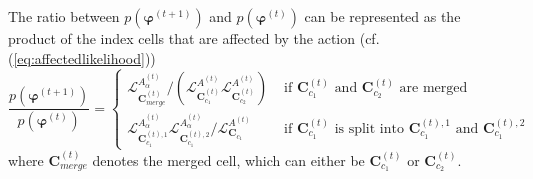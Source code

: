 The ratio between $p(\boldsymbol{\varphi}^{(t+1)})$ and $p(\boldsymbol{\varphi}^{(t)})$ can be represented as the product of the index cells that are affected by the action (cf. (\ref{eq:affectedlikelihood}))
\begin{equation}
    \frac{p(\boldsymbol{\varphi}^{(t+1)})}{p(\boldsymbol{\varphi}^{(t)})} = \begin{cases}
    \mathcal{L}^{A^{(t)}_{\alpha}}_{\mathbf{C}_{merge}^{(t)}}/(\mathcal{L}^{A^{(t)}}_{\mathbf{C}_{c_1}^{(t)}}\mathcal{L}^{A^{(t)}}_{\mathbf{C}_{c_2}^{(t)}}) & \text{  if  } \mathbf{C}_{c_1}^{(t)} \text{  and  } \mathbf{C}_{c_2}^{(t)} \text{  are merged  }\\
    \mathcal{L}^{A^{(t)}_{\alpha}}_{\mathbf{C}_{c_1}^{(t),1}}\mathcal{L}^{A^{(t)}_{\alpha}}_{\mathbf{C}_{c_1}^{(t),2}}/\mathcal{L}^{A^{(t)}}_{\mathbf{C}_{c_1}} & \text{  if  } \mathbf{C}_{c_1}^{(t)} \text{  is split into  } \mathbf{C}_{c_1}^{(t),1} \text{  and  } \mathbf{C}_{c_1}^{(t),2}
    \end{cases}
\end{equation}
where $\mathbf{C}_{merge}^{(t)}$ denotes the merged cell, which can either be $\mathbf{C}_{c_1}^{(t)}$ or $\mathbf{C}_{c_2}^{(t)}$. 

